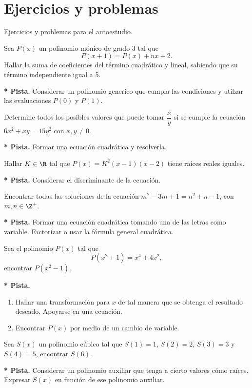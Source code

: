 \section{Ejercicios y problemas}

Ejercicios y problemas para el autoestudio.

\begin{exercise}
    Sea $P(x)$ un polinomio mónico de grado 3 tal que
    \[
        P(x + 1) = P(x) + nx + 2.
    \]
    Hallar la suma de coeficientes del término cuadrático y lineal, sabiendo que su término independiente igual a 5.
\end{exercise}
\textbf{* Pista.} Considerar un polinomio generico que cumpla las condiciones y utilzar las evaluaciones $P(0)$ y $P(1)$.


\begin{exercise}
    Determine todos los posibles valores que puede tomar $\dfrac{x}{y}$ si se cumple la ecuación $6x^2 + xy = 15y^2$ con $x,y \neq 0$.
\end{exercise}
\textbf{* Pista.} Formar una ecuación cuadrática y resolverla.


\begin{exercise}
    Hallar $K \in \R$ tal que $P(x) = K^2(x - 1)(x - 2)$ tiene raíces reales iguales.
\end{exercise}
\textbf{* Pista.} Considerar el discriminante de la ecuación.


\begin{exercise}
    Encontrar todas las soluciones de la ecuación $m^2 - 3m + 1 = n^2 + n - 1$, con $m, n \in \Z^{+}$.
\end{exercise}
\textbf{* Pista.} Formar una ecuación cuadrática tomando una de las letras como variable.
Factorizar o usar la fórmula general cuadrática.


\begin{exercise}
    Sea el polinomio $P(x)$ tal que
    \[
        P(x^2 + 1) = x^4 + 4x^2,
    \]
    encontrar $P(x^2 - 1).$
\end{exercise}
\textbf{* Pista.} \begin{enumerate}
    \item Hallar una transformación para $x$ de tal manera que se obtenga el resultado deseado. Apoyarse en una ecuación.
    \item Encontrar $P(x)$ por medio de un cambio de variable.
\end{enumerate}


\begin{exercise}
    Sea $S(x)$ un polinomio cúbico tal que $S(1) = 1$, $S(2) = 2$, $S(3) = 3$ y $S(4) = 5$, encontrar $S(6)$.
\end{exercise}
\textbf{* Pista.} Considerar un polinomio auxiliar que tenga a cierto valores cómo raíces.
Expresar $S(x)$ en función de ese polinomio auxiliar.


